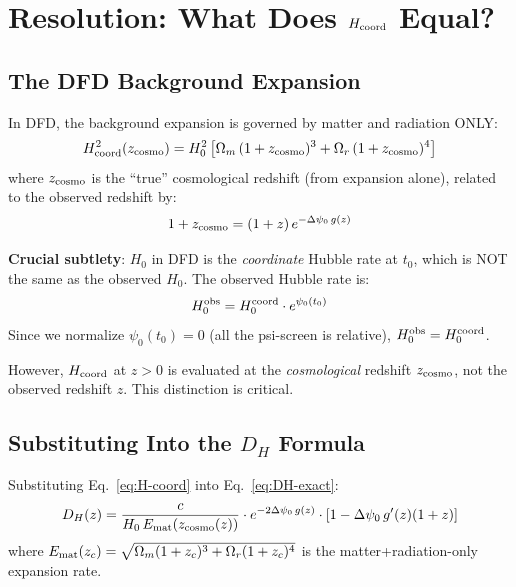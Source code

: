 \documentclass[11pt,a4paper]{article}
\newcommand{\Omm}{\Omega_m}
\begin{document}
\section{Resolution: What Does $H_{\rm coord}$ Equal?}
\label{sec:resolution}

\subsection{The DFD Background Expansion}

In DFD, the background expansion is governed by matter and radiation ONLY:
\begin{equation}
H_{\rm coord}^2(z_{\rm cosmo}) = H_0^2\left[\Omm\,(1+z_{\rm cosmo})^3
+ \Omega_r\,(1+z_{\rm cosmo})^4\right]
\label{eq:H-coord}
\end{equation}
where $z_{\rm cosmo}$ is the ``true'' cosmological redshift (from expansion
alone), related to the observed redshift by:
\begin{equation}
1 + z_{\rm cosmo} = (1+z)\,e^{-\Delta\psi_0\,g(z)}
\end{equation}

\textbf{Crucial subtlety}: $H_0$ in DFD is the \emph{coordinate} Hubble
rate at $t_0$, which is NOT the same as the observed $H_0$. The observed
Hubble rate is:
\begin{equation}
H_0^{\rm obs} = H_0^{\rm coord} \cdot e^{\psi_0(t_0)}
\end{equation}
Since we normalize $\psi_0(t_0) = 0$ (all the psi-screen is relative),
$H_0^{\rm obs} = H_0^{\rm coord}$.

However, $H_{\rm coord}$ at $z > 0$ is evaluated at the \emph{cosmological}
redshift $z_{\rm cosmo}$, not the observed redshift $z$. This distinction
is critical.

\subsection{Substituting Into the $D_H$ Formula}

Substituting Eq.~\eqref{eq:H-coord} into Eq.~\eqref{eq:DH-exact}:
\begin{equation}
D_H(z) = \frac{c}{H_0\,E_{\rm mat}(z_{\rm cosmo}(z))}
\cdot e^{-2\Delta\psi_0\,g(z)}
\cdot [1 - \Delta\psi_0\,g'(z)(1+z)]
\label{eq:DH-substituted}
\end{equation}
where $E_{\rm mat}(z_c) = \sqrt{\Omm(1+z_c)^3 + \Omega_r(1+z_c)^4}$
is the matter+radiation-only expansion rate.
\end{document}

